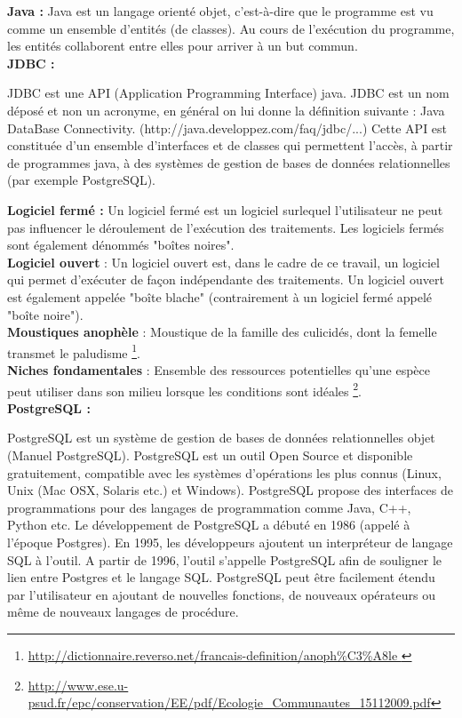 \textbf{Java : }
Java est un langage orienté objet, c'est-à-dire que le programme est vu comme un ensemble d'entités (de classes). Au cours de l'exécution du programme,
les entités collaborent entre elles pour arriver à un but commun.\\


\textbf{JDBC : }

JDBC est une API (Application Programming Interface) java. JDBC est un nom déposé et non un acronyme, en général on lui donne la définition suivante : Java DataBase Connectivity. (http://java.developpez.com/faq/jdbc/...)
Cette API est constituée d'un ensemble d'interfaces et de classes qui permettent l'accès, à partir de programmes java, à des systèmes de gestion de bases de données relationnelles (par exemple PostgreSQL). 

\textbf{Logiciel fermé : } Un logiciel fermé est un logiciel surlequel l'utilisateur ne peut pas influencer le déroulement de l'exécution des traitements. Les logiciels fermés sont également dénommés "boîtes noires".\\


\textbf{Logiciel ouvert }: Un logiciel ouvert est, dans le cadre de ce travail, un logiciel qui permet d'exécuter de façon indépendante des traitements. Un logiciel ouvert est également appelée "boîte blache" (contrairement à un logiciel fermé appelé "boîte noire").\\



\textbf{Moustiques anophèle }:  Moustique de la famille des culicidés, dont la femelle transmet le paludisme \footnote{\url{ http://dictionnaire.reverso.net/francais-definition/anoph\%C3\%A8le }}.\\

\textbf{Niches fondamentales} : Ensemble des ressources potentielles qu’une espèce peut utiliser dans son
milieu lorsque les conditions sont idéales \footnote{\url{http://www.ese.u-psud.fr/epc/conservation/EE/pdf/Ecologie\_Communautes\_15112009.pdf}}.\\

\textbf{PostgreSQL : }

PostgreSQL est un système de gestion de bases de données relationnelles objet (Manuel PostgreSQL). PostgreSQL est un outil Open Source et disponible gratuitement, compatible avec les systèmes d'opérations les plus connus (Linux, Unix (Mac OSX, Solaris etc.) et Windows). PostgreSQL propose des interfaces de programmations pour des langages de programmation comme Java, C++, Python etc.
Le développement de PostgreSQL a débuté en 1986 (appelé à l'époque Postgres). En 1995, les développeurs ajoutent un interpréteur de langage SQL à l'outil. A partir de 1996, l'outil s'appelle PostgreSQL afin de souligner le lien entre Postgres et le langage SQL. PostgreSQL peut être facilement étendu par l'utilisateur en ajoutant de nouvelles fonctions, de nouveaux opérateurs ou même de nouveaux langages de procédure.\\


